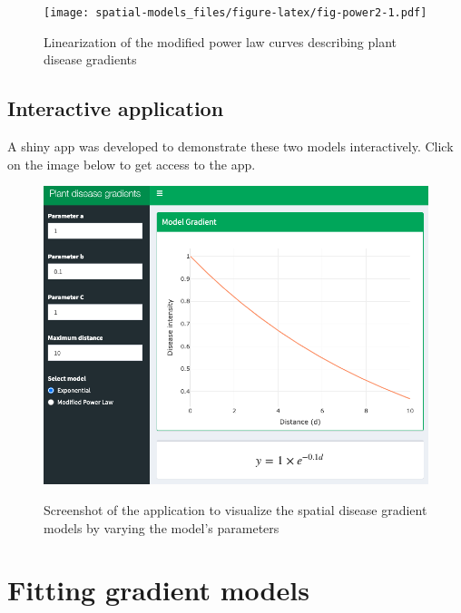 \documentclass[
  letterpaper,
]{book}
\begin{document}
\begin{figure}

{\centering \texttt{[image: spatial-models\_files/figure-latex/fig-power2-1.pdf]}

}

\caption{\label{fig-power2}Linearization of the modified power law
curves describing plant disease gradients}

\end{figure}

\hypertarget{interactive-application-1}{%
\section{Interactive application}\label{interactive-application-1}}

A shiny app was developed to demonstrate these two models interactively.
Click on the image below to get access to the app.

\begin{figure}

{\centering 

\href{https://delponte.shinyapps.io/gradients}{\includegraphics[width=5.55208in,height=\textheight]{imgs/shiny_gradients.png}}

}

\caption{\label{fig-models}Screenshot of the application to visualize
the spatial disease gradient models by varying the model's parameters}

\end{figure}

\hypertarget{fitting-gradient-models}{%
\chapter{Fitting gradient models}\label{fitting-gradient-models}}
\end{document}
